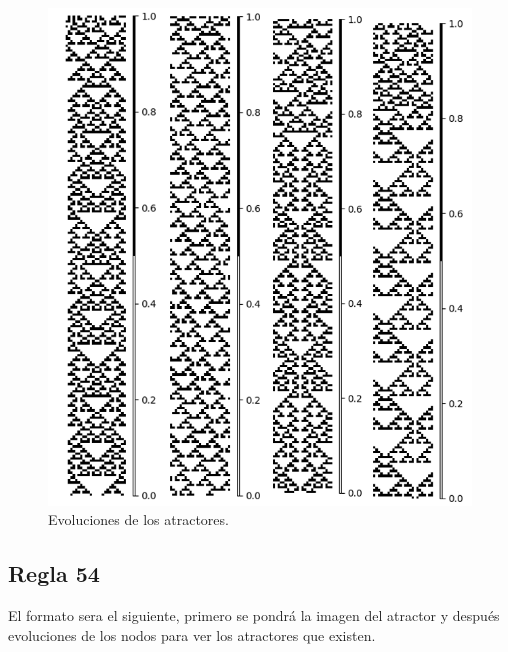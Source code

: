 \documentclass[11pt]{article}
\begin{document}
			\begin{figure}[H]
			\centering
			\includegraphics[scale=0.3]{resources/Atractores22/atractor_22_size_25_res.png}
			\caption{Evoluciones de los atractores.}\label{fig:picture}
			\end{figure}
		\subsection{Regla 54}
		El formato sera el siguiente, primero se pondrá la imagen del atractor y después evoluciones de los nodos para ver los atractores que existen.
\end{document}
